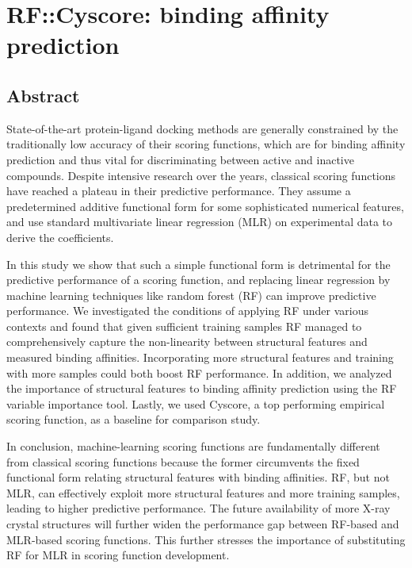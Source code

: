 \chapter{RF::Cyscore: binding affinity prediction}
\label{rfcyscore}

\section{Abstract}

State-of-the-art protein-ligand docking methods are generally constrained by the traditionally low accuracy of their scoring functions, which are for binding affinity prediction and thus vital for discriminating between active and inactive compounds. Despite intensive research over the years, classical scoring functions have reached a plateau in their predictive performance. They assume a predetermined additive functional form for some sophisticated numerical features, and use standard multivariate linear regression (MLR) on experimental data to derive the coefficients.

In this study we show that such a simple functional form is detrimental for the predictive performance of a scoring function, and replacing linear regression by machine learning techniques like random forest (RF) can improve predictive performance. We investigated the conditions of applying RF under various contexts and found that given sufficient training samples RF managed to comprehensively capture the non-linearity between structural features and measured binding affinities. Incorporating more structural features and training with more samples could both boost RF performance. In addition, we analyzed the importance of structural features to binding affinity prediction using the RF variable importance tool. Lastly, we used Cyscore, a top performing empirical scoring function, as a baseline for comparison study.

In conclusion, machine-learning scoring functions are fundamentally different from classical scoring functions because the former circumvents the fixed functional form relating structural features with binding affinities. RF, but not MLR, can effectively exploit more structural features and more training samples, leading to higher predictive performance. The future availability of more X-ray crystal structures will further widen the performance gap between RF-based and MLR-based scoring functions. This further stresses the importance of substituting RF for MLR in scoring function development.

